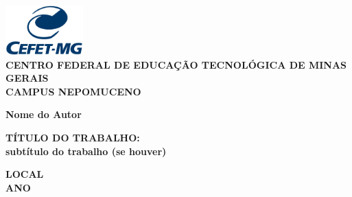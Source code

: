 \thispagestyle{empty}
\begin{titlepage}

\begin{center}
\includegraphics[width=3cm]{graphics/600px-Logo_CEFET-MG_corte.png}\\
\vspace{0.5cm}
{\normalsize \textbf{CENTRO FEDERAL DE EDUCAÇÃO TECNOLÓGICA DE MINAS GERAIS \\
CAMPUS NEPOMUCENO}}

\vspace{0.8cm}
{\large \textbf{Nome do Autor}}

\vspace{6cm}

{\large \textbf{TÍTULO DO TRABALHO: \\ \vspace{0.5 cm} subtítulo do trabalho (se houver)}} \\
\vspace{0.5 cm}

\vspace{5 cm}


\vspace{3cm}
{\large \textbf{LOCAL}} \\
{\large \textbf{ANO}}
\end{center}
\end{titlepage}

\newpage
\thispagestyle{empty}

\newpage\ \newpage